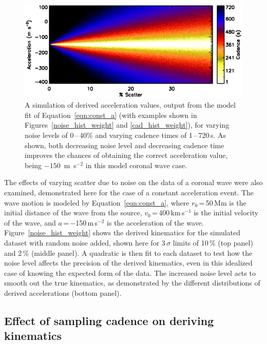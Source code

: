 \documentclass[structabstract]{aa}
\begin{document}
\begin{figure}[!hb]
\begin{center}
\includegraphics[scale=0.53, trim=20 10 0 20]{images/fig_noise_cad.eps}
\caption{A simulation of derived acceleration values, output from the model fit of Equation~\ref{eqn:const_a} (with examples shown in Figures~\ref{noise_hist_weight} and \ref{cad_hist_weight}), for varying noise levels of 0\,--\,40\% and varying cadence times of 1\,--\,720\,s. As shown, both decreasing noise level and decreasing cadence time improves the chances of obtaining the correct acceleration value, being $-150$~m~s$^{-2}$ in this model coronal wave case.}
\label{noise_test_image}
\end{center}
\end{figure}

The effects of varying scatter due to noise on the data of a coronal wave were also examined, demonstrated here for the case of a constant acceleration event. The wave motion is modeled by Equation~\ref{eqn:const_a}, where $r_0$\,=\,50\,Mm is the initial distance of the wave from the source, $v_0$\,=\,400\,km\,s$^{-1}$ is the initial velocity of the wave, and $a$\,=\,$-$150\,m\,s$^{-2}$ is the acceleration of the wave. Figure~\ref{noise_hist_weight} shows the derived kinematics for the simulated dataset with random noise added, shown here for 3\,$\sigma$ limits of 10\,\% (top panel) and 2\,\% (middle panel). A quadratic is then fit to each dataset to test how the noise level affects the precision of the derived kinematics, even in this idealized case of knowing the expected form of the data. The increased noise level acts to smooth out the true kinematics, as demonstrated by the different distributions of derived accelerations (bottom panel).

\subsection{Effect of sampling cadence on deriving kinematics}
\label{subsect:test_lagrange_nonconst}
\end{document}
